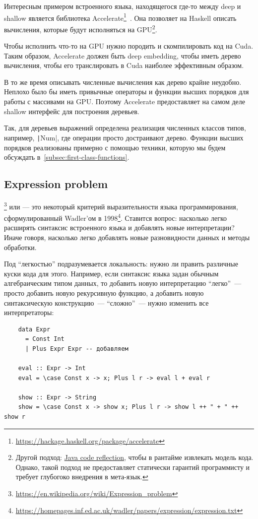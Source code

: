 Интересным примером встроенного языка, находящегося где-то между deep и shallow является библиотека Accelerate\footnote{\url{https://hackage.haskell.org/package/accelerate}}~\cite[глава 6]{marlow2011parallel}.
Она позволяет на Haskell описать вычисления, которые будут исполняться на GPU\footnote{Другой подход: \href{https://youtu.be/6c0DB2kwF_Q?si=-nB7AkCsDWB_Q-hy}{Java code reflection}, чтобы в рантайме извлекать модель кода. Однако, такой подход не предоставляет статически гарантий программисту и требует глубогоко внедрения в мета-язык.}.

Чтобы исполнить что-то на GPU нужно породить и скомпилировать код на Cuda.
Таким образом, Accelerate должен быть deep embedding, чтобы иметь дерево вычисления, чтобы его транслировать в Cuda наиболее эффективным образом.

В то же время описывать численные вычисления как дерево крайне неудобно.
Неплохо было бы иметь привычные операторы и функции высших порядков для работы с массивами на GPU\@.
Поэтому Accelerate предоставляет на самом деле shallow интерфейс для построения деревьев.

Так, для деревьев выражений определена реализация численных классов типов, например, \texttt|Num|, где операции просто достраивают дерево.
Функции высших порядков реализованы примерно с помощью техники, которую мы будем обсуждать в~\ref{subsec:first-class-functions}. %


\subsection{Expression problem} \label{subsec:expression-problem}

\footnote{\url{https://en.wikipedia.org/wiki/Expression_problem}} или  --- это некоторый критерий выразительности языка программирования, сформулированный Wadler'ом в 1998\footnote{\url{https://homepages.inf.ed.ac.uk/wadler/papers/expression/expression.txt}}.
Ставится вопрос: насколько легко расширять синтаксис встроенного языка и добавлять новые интерпретации?
Иначе говоря, насколько легко добавлять новые разновидности данных и методы обработки.

Под ``легкостью'' подразумевается локальность: нужно ли править различные куски кода для этого.
Например, если синтаксис языка задан обычным алгебраическим типом данных, то добавить новую интерпретацию ``легко''~--- просто добавить новую рекурсивную функцию, а добавить новую синтаксическую конструкцию~--- ``сложно''~--- нужно изменить все интерпретаторы:
\begin{verbatim}
    data Expr
      = Const Int
      | Plus Expr Expr -- добавляем

    eval :: Expr -> Int
    eval = \case Const x -> x; Plus l r -> eval l + eval r

    show :: Expr -> String
    show = \case Const x -> show x; Plus l r -> show l ++ " + " ++ show r
\end{verbatim}


